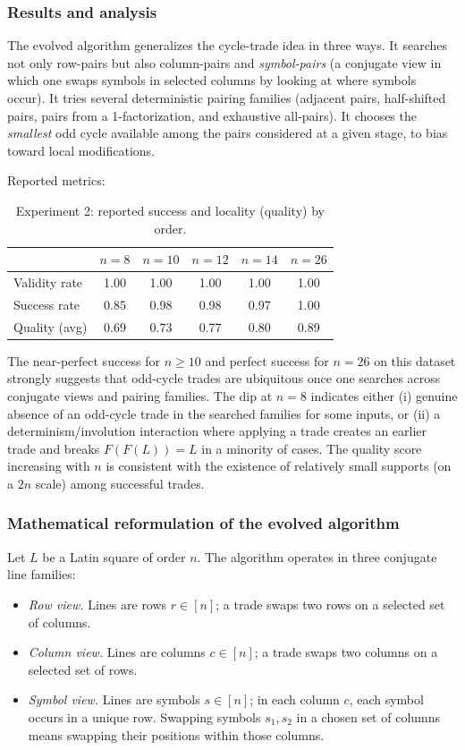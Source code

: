 \documentclass[11pt]{amsart}
\begin{document}
\subsubsection{Results and analysis}
The evolved algorithm generalizes the cycle-trade idea in three ways. It searches not only row-pairs but also column-pairs and \emph{symbol-pairs} (a conjugate view in which one swaps symbols in selected columns by looking at where symbols occur). It tries several deterministic pairing families (adjacent pairs, half-shifted pairs, pairs from a 1-factorization, and exhaustive all-pairs). It chooses the \emph{smallest} odd cycle available among the pairs considered at a given stage, to bias toward local modifications.

Reported metrics:

\begin{table}[h]
\centering
\begin{tabular}{@{}lccccc@{}}
\toprule
 & $n=8$ & $n=10$ & $n=12$ & $n=14$ & $n=26$ \\
\midrule
Validity rate & 1.00 & 1.00 & 1.00 & 1.00 & 1.00 \\
Success rate  & 0.85 & 0.98 & 0.98 & 0.97 & 1.00 \\
Quality (avg) & 0.69 & 0.73 & 0.77 & 0.80 & 0.89 \\
\bottomrule
\end{tabular}
\caption{Experiment 2: reported success and locality (quality) by order.}
\end{table}

The near-perfect success for $n\ge 10$ and perfect success for $n=26$ on this dataset strongly suggests that
odd-cycle trades are ubiquitous once one searches across conjugate views and pairing families.
The dip at $n=8$ indicates either (i) genuine absence of an odd-cycle trade in the searched families for some inputs, or
(ii) a determinism/involution interaction where applying a trade creates an earlier trade and breaks $F(F(L))=L$ in a minority of cases.
The quality score increasing with $n$ is consistent with the existence of relatively small supports (on a $2n$ scale) among successful trades.

\subsubsection{Mathematical reformulation of the evolved algorithm}
Let $L$ be a Latin square of order $n$.  The algorithm operates in three conjugate line families:
\begin{itemize}
\item \emph{Row view.} Lines are rows $r\in[n]$; a trade swaps two rows on a selected set of columns.
\item \emph{Column view.} Lines are columns $c\in[n]$; a trade swaps two columns on a selected set of rows.
\item \emph{Symbol view.} Lines are symbols $s\in[n]$; in each column $c$, each symbol occurs in a unique row.  Swapping symbols $s_1,s_2$ in a chosen set of columns means swapping their positions within those columns.
\end{itemize}
\end{document}
